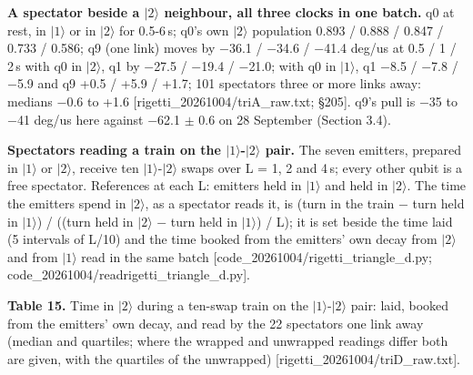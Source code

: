 \documentclass[11pt]{article}
\begin{document}
\textbf{A spectator beside a \(|2\rangle\) neighbour, all three clocks in one batch.} q0 at rest, in \(|1\rangle\) or in \(|2\rangle\) for 0.5-6\,\textmu s; q0's own \(|2\rangle\) population 0.893 / 0.888 / 0.847 / 0.733 / 0.586; q9 (one link) moves by \(-\)36.1 / \(-\)34.6 / \(-\)41.4 deg/us at 0.5 / 1 / 2\,\textmu s with q0 in \(|2\rangle\), q1 by \(-\)27.5 / \(-\)19.4 / \(-\)21.0; with q0 in \(|1\rangle\), q1 \(-\)8.5 / \(-\)7.8 / \(-\)5.9 and q9 +0.5 / +5.9 / +1.7; 101 spectators three or more links away: medians \(-\)0.6 to +1.6 {[}rigetti\_20261004/triA\_raw.txt; \S{}205{]}. q9's pull is \(-\)35 to \(-\)41 deg/us here against \(-\)62.1 \(\pm\) 0.6 on 28 September (Section 3.4).

\textbf{Spectators reading a train on the \(|1\rangle\)-\(|2\rangle\) pair.} The seven emitters, prepared in \(|1\rangle\) or \(|2\rangle\), receive ten \(|1\rangle\)-\(|2\rangle\) swaps over L = 1, 2 and 4\,\textmu s; every other qubit is a free spectator. References at each L: emitters held in \(|1\rangle\) and held in \(|2\rangle\). The time the emitters spend in \(|2\rangle\), as a spectator reads it, is (turn in the train \(-\) turn held in \(|1\rangle\)) / ((turn held in \(|2\rangle\) \(-\) turn held in \(|1\rangle\)) / L); it is set beside the time laid (5 intervals of L/10) and the time booked from the emitters' own decay from \(|2\rangle\) and from \(|1\rangle\) read in the same batch {[}code\_20261004/rigetti\_triangle\_d.py; code\_20261004/readrigetti\_triangle\_d.py{]}.

\textbf{Table 15.} Time in \(|2\rangle\) during a ten-swap train on the \(|1\rangle\)-\(|2\rangle\) pair: laid, booked from the emitters' own decay, and read by the 22 spectators one link away (median and quartiles; where the wrapped and unwrapped readings differ both are given, with the quartiles of the unwrapped) {[}rigetti\_20261004/triD\_raw.txt{]}.
\end{document}

